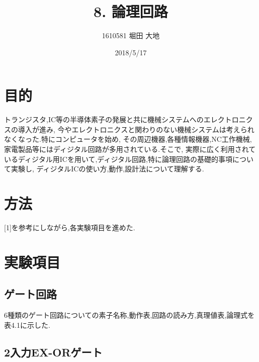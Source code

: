 \documentclass[twocolumn, 10pt,a4j]{jsarticle}
\title{\vspace{-2.5cm}8. 論理回路}
\author{1610581 堀田 大地}
\date{2018/5/17}
\begin{document}
\maketitle{}
\vspace{-10zh}
\section{目的}
トランジスタ,IC等の半導体素子の発展と共に機械システムへのエレクトロニクスの導入が進み,
今やエレクトロニクスと関わりのない機械システムは考えられなくなった.特にコンピュータを始め,
その周辺機器,各種情報機器,NC工作機械, 家電製品等にはディジタル回路が多用されている.そこで,
実際に広く利用されているディジタル用ICを用いて,ディジタル回路,特に論理回路の基礎的事項について実験し,
ディジタルICの使い方,動作,設計法について理解する.
\section{方法}
[1]を参考にしながら,各実験項目を進めた.
\section{実験項目}
\subsection{ゲート回路}
6種類のゲート回路についての素子名称,動作表,回路の読み方,真理値表,論理式を表4.1に示した.
\subsection{2入力EX-ORゲート}
\end{document}
